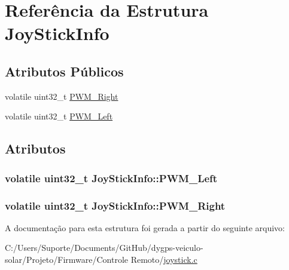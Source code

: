\hypertarget{struct_joy_stick_info}{}\section{Referência da Estrutura Joy\+Stick\+Info}
\label{struct_joy_stick_info}
\subsection*{Atributos Públicos}
\begin{DoxyCompactItemize}
\item 
volatile uint32\+\_\+t \hyperlink{struct_joy_stick_info_a43bb0392e517e09e23f4cbf096ebefa2}{P\+W\+M\+\_\+\+Right}
\item 
volatile uint32\+\_\+t \hyperlink{struct_joy_stick_info_a1e24ef49f61975309d6a5b37daed8a95}{P\+W\+M\+\_\+\+Left}
\end{DoxyCompactItemize}


\subsection{Atributos}
\hypertarget{struct_joy_stick_info_a1e24ef49f61975309d6a5b37daed8a95}{}
\subsubsection[{P\+W\+M\+\_\+\+Left}]{\setlength{\rightskip}{0pt plus 5cm}volatile uint32\+\_\+t Joy\+Stick\+Info\+::\+P\+W\+M\+\_\+\+Left}\label{struct_joy_stick_info_a1e24ef49f61975309d6a5b37daed8a95}
\hypertarget{struct_joy_stick_info_a43bb0392e517e09e23f4cbf096ebefa2}{}
\subsubsection[{P\+W\+M\+\_\+\+Right}]{\setlength{\rightskip}{0pt plus 5cm}volatile uint32\+\_\+t Joy\+Stick\+Info\+::\+P\+W\+M\+\_\+\+Right}\label{struct_joy_stick_info_a43bb0392e517e09e23f4cbf096ebefa2}


A documentação para esta estrutura foi gerada a partir do seguinte arquivo\+:\begin{DoxyCompactItemize}
\item 
C\+:/\+Users/\+Suporte/\+Documents/\+Git\+Hub/dygps-\/veiculo-\/solar/\+Projeto/\+Firmware/\+Controle Remoto/\hyperlink{joystick_8c}{joystick.\+c}\end{DoxyCompactItemize}
